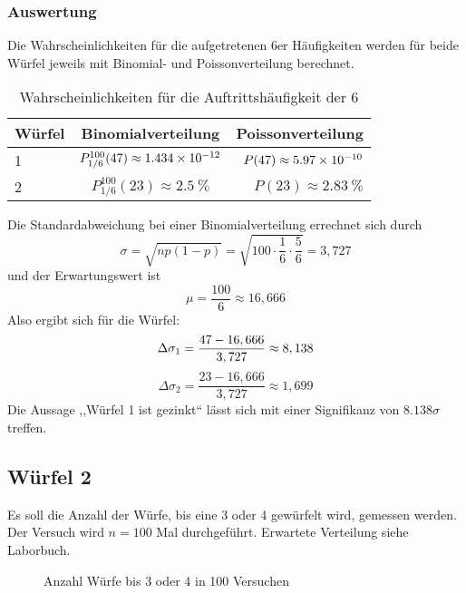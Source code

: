 \subsubsection{Auswertung}
Die Wahrscheinlichkeiten für die aufgetretenen 6er Häufigkeiten werden für beide Würfel jeweils mit Binomial- und Poissonverteilung berechnet.
\renewcommand{\arraystretch}{1.4}
\begin{table}[h]
  \centering
  \begin{tabular}{l | c | r}
    Würfel & Binomialverteilung & Poissonverteilung \\ \hline
    1 & $P^{100}_{1/6}(47)\approx \num{1.434d-12}$ & $P(47)\approx\num{5.97d-10}$ \\
    2 & $P^{100}_{1/6}(23)\approx \SI{2.5}{\percent}$ & $P(23)\approx\SI{2.83}{\percent}$ \\
  \end{tabular}
  \caption{Wahrscheinlichkeiten für die Auftrittshäufigkeit der 6}
  \label{tab:binvspoisson}
\end{table}
Die Standardabweichung bei einer Binomialverteilung errechnet sich durch
\begin{equation}
  \sigma=\sqrt{np(1-p)}=\sqrt{100\cdot\frac{1}{6}\cdot \frac{5}{6}}=3,727
  \label{sbin}
\end{equation}
und der Erwartungswert ist
\begin{equation}
  \mu=\frac{100}{6}\approx 16,666
  \label{erwwert}
\end{equation}
Also ergibt sich für die Würfel:
\begin{equation}
  \Delta\sigma_1=\frac{47-16,666}{3,727}\approx 8,138 \\
  \label{wuerfelsigma1}
\end{equation}
\begin{equation}
  \Delta\sigma_2=\frac{23-16,666}{3,727}\approx 1,699
  \label{wuerfelsigma2}
\end{equation}
Die Aussage ,,Würfel 1 ist gezinkt`` lässt sich mit einer Signifikanz von $8.138\sigma$ treffen.

\subsection{Würfel 2}
Es soll die Anzahl der Würfe, bis eine 3 oder 4 gewürfelt wird, gemessen werden. Der Versuch wird $n=100$ Mal durchgeführt. Erwartete Verteilung siehe Laborbuch.
\begin{figure}[H]
  \centering
  \caption{Anzahl Würfe bis 3 oder 4 in 100 Versuchen}
  \label{fig:wuerfel2}
\end{figure}

